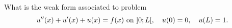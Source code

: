 \bexo
What is the weak form associated to problem
\begin{equation}
	u''(x)+u'(x)+u(x)=f(x) \textrm{ on } ]0;L[, \quad u(0)=0 , \quad u(L)=1. 
\end{equation}

\eexo

